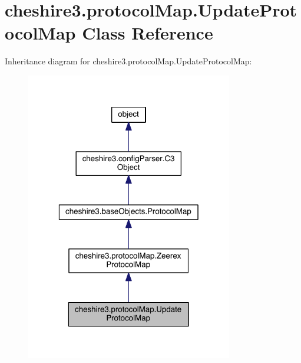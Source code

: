\hypertarget{classcheshire3_1_1protocol_map_1_1_update_protocol_map}{\section{cheshire3.\-protocol\-Map.\-Update\-Protocol\-Map Class Reference}
\label{classcheshire3_1_1protocol_map_1_1_update_protocol_map}
}


Inheritance diagram for cheshire3.\-protocol\-Map.\-Update\-Protocol\-Map\-:
\nopagebreak
\begin{figure}[H]
\begin{center}
\leavevmode
\includegraphics[width=256pt]{classcheshire3_1_1protocol_map_1_1_update_protocol_map__inherit__graph}
\end{center}
\end{figure}


